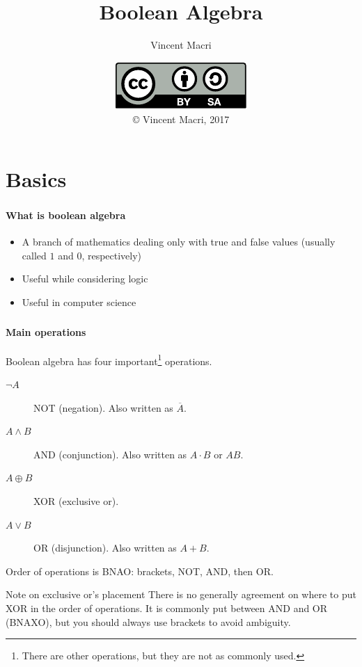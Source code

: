 \documentclass{beamer}
\title{Boolean Algebra}
\author{Vincent Macri}
\date{\includegraphics{../LicenseLogo}\\\copyright{} Vincent Macri, 2017}
\newenvironment{namedframe}[1]%
	{\begin{frame}\frametitle{\secname}\framesubtitle{#1}}
	{\end{frame}}
\newcommand{\xor}{\oplus}
\newcommand{\negate}[1]{\overline{#1}}
\begin{document}
	\frame{\titlepage}
	\section{Basics}
	\begin{namedframe}{What is boolean algebra}
		\begin{itemize}[<+->]
			\item A branch of mathematics dealing only with true and false values (usually called $1$ and $0$, respectively)
			\item Useful while considering logic
			\item Useful in computer science
		\end{itemize}
	\end{namedframe}
	\begin{namedframe}{Main operations}
		Boolean algebra has four important\footnote{There are other operations, but they are not as commonly used.} operations.
		\pause
		\begin{description}
			\item[$\neg A$] NOT (negation). Also written as $\negate{A}$.
			\item[$A \wedge B$] AND (conjunction). Also written as $A \cdot B$ or $AB$.
			\item[$A \xor B$] XOR (exclusive or).
			\item[$A \vee B$] OR (disjunction). Also written as $A + B$.
		\end{description}
		\pause
		Order of operations is \alert{BNAO}: brackets, NOT, AND, then OR.
		\pause
		\begin{alertblock}{Note on exclusive or's placement}
			\vspace{-0.5\baselineskip}
			There is no generally agreement on where to put XOR in the order of operations. It is commonly put between AND and OR (BNAXO), but you should always use brackets to avoid ambiguity.
		\end{alertblock}
	\end{namedframe}
\end{document}

